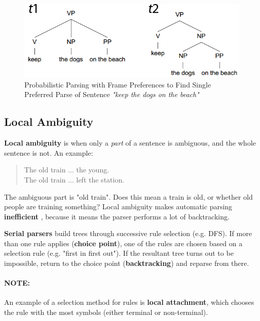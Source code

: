 \documentclass{article}
\begin{document}
\begin{figure}[H]
	\centering
	\includegraphics[scale=0.45]{figures/keep-frame-preference-example.png}
	\caption{Probabilistic Parsing with Frame Preferences to Find Single Preferred Parse of Sentence \textit{"keep the dogs on the beach"}}
	\label{fig:keep-frame-probability-example}
\end{figure}

\subsection{Local Ambiguity}

\textbf{Local ambiguity} is when only a \textit{part} of a sentence is ambiguous, and the whole sentence is not. An example:
\begin{quote}
	The old train ... the young. \\
	The old train ... left the station.
\end{quote}
The ambiguous part is "old train". Does this mean a train is old, or whether old people are training something? Local ambiguity makes automatic parsing \textbf{inefficient} , because it means the parser performs a lot of backtracking.

\textbf{Serial parsers} build trees through successive rule selection (e.g. DFS). If more than one rule applies (\textbf{choice point}), one of the rules are chosen based on a selection rule (e.g. "first in first out"). If the resultant tree turns out to be impossible, return to the choice point (\textbf{backtracking}) and reparse from there. 

\paragraph{\textbf{NOTE: }} An example of a selection method for rules is \textbf{local attachment}, which chooses the rule with the most symbols (either terminal or non-terminal).
\paragraph{}
\end{document}

